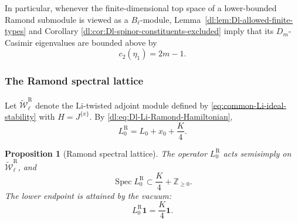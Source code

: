 \documentclass[11pt,reqno]{amsart}
\newtheorem{proposition}[theorem]{Proposition}
\theoremstyle{definition}
\theoremstyle{remark}
\begin{document}
In particular, whenever the finite-dimensional top space of a
lower-bounded Ramond submodule is viewed as a \(B_\ell\)-module,
Lemma~\ref{dl:lem:Dl-allowed-finite-types} and Corollary
\ref{dl:cor:Dl-spinor-constituents-excluded} imply that its
\(D_m\)-Casimir eigenvalues are bounded above by
\begin{equation}
  c_2(\eta_1)=2m-1.
  \label{dl:eq:Dl-D-Casimir-bound-after-spinor-exclusion}
\end{equation}

\subsubsection{The Ramond spectral lattice}


Let
\(\widetilde{\mathcal W}_\ell^{\mathrm R}\) denote the Li-twisted
adjoint module defined by \eqref{eq:common-Li-ideal-stability} with
\(H=J^{\{x\}}\).  By
\eqref{dl:eq:Dl-Li-Ramond-Hamiltonian},
\begin{equation}
  L_0^{\mathrm R}
  =
  L_0+x_0+\frac K4.
  \label{dl:eq:Dl-section5-Ramond-Hamiltonian}
\end{equation}

\begin{proposition}[Ramond spectral lattice]
\label{dl:prop:Dl-Ramond-spectral-lattice}
The operator \(L_0^{\mathrm R}\) acts semisimply on
\(\widetilde{\mathcal W}_\ell^{\mathrm R}\), and
\begin{equation}
  \operatorname{Spec}L_0^{\mathrm R}
  \subset
  \frac K4+\mathbb Z_{\ge0}.
  \label{dl:eq:Dl-Ramond-spectrum-inclusion}
\end{equation}
The lower endpoint is attained by the vacuum:
\begin{equation}
  L_0^{\mathrm R}\mathbf1
  =
  \frac K4\mathbf1.
  \label{dl:eq:Dl-Ramond-vacuum-energy}
\end{equation}
\end{proposition}
\end{document}
